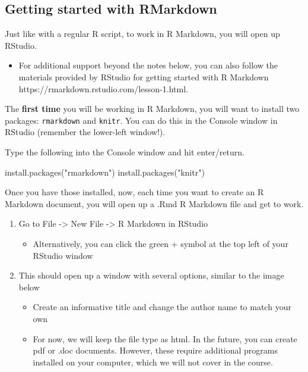\documentclass[
  letterpaper,
  DIV=11,
  numbers=noendperiod]{scrreprt}
\newenvironment{Shaded}{\begin{snugshade}}{\end{snugshade}}
\newcommand{\FunctionTok}[1]{\textcolor[rgb]{0.28,0.35,0.67}{#1}}
\newcommand{\NormalTok}[1]{\textcolor[rgb]{0.00,0.23,0.31}{#1}}
\newcommand{\StringTok}[1]{\textcolor[rgb]{0.13,0.47,0.30}{#1}}
\providecommand{\tightlist}{%
  \setlength{\itemsep}{0pt}\setlength{\parskip}{0pt}}\usepackage{longtable,booktabs,array}
\begin{document}
\hypertarget{getting-started-with-rmarkdown}{%
\subsection{Getting started with
RMarkdown}\label{getting-started-with-rmarkdown}}

Just like with a regular R script, to work in R Markdown, you will open
up RStudio.

\begin{itemize}
\tightlist
\item
  For additional support beyond the notes below, you can also follow the
  materials provided by RStudio for getting started with R Markdown
  https://rmarkdown.rstudio.com/lesson-1.html.
\end{itemize}

The \textbf{first time} you will be working in R Markdown, you will want
to install two packages: \texttt{rmarkdown} and \texttt{knitr}. You can
do this in the Console window in RStudio (remember the lower-left
window!).

Type the following into the Console window and hit enter/return.

\begin{Shaded}
\begin{Highlighting}[]
\FunctionTok{install.packages}\NormalTok{(}\StringTok{"rmarkdown"}\NormalTok{)}
\FunctionTok{install.packages}\NormalTok{(}\StringTok{"knitr"}\NormalTok{)}
\end{Highlighting}
\end{Shaded}

Once you have those installed, now, each time you want to create an R
Markdown document, you will open up a .Rmd R Markdown file and get to
work.

\begin{enumerate}
\def\labelenumi{\arabic{enumi}.}
\tightlist
\item
  Go to File -\textgreater{} New File -\textgreater{} R Markdown in
  RStudio

  \begin{itemize}
  \tightlist
  \item
    Alternatively, you can click the green + symbol at the top left of
    your RStudio window
  \end{itemize}
\item
  This should open up a window with several options, similar to the
  image below

  \begin{itemize}
  \tightlist
  \item
    Create an informative title and change the author name to match your
    own
  \item
    For now, we will keep the file type as html. In the future, you can
    create pdf or .doc documents. However, these require additional
    programs installed on your computer, which we will not cover in the
    course.
  \end{itemize}
\end{enumerate}
\end{document}
